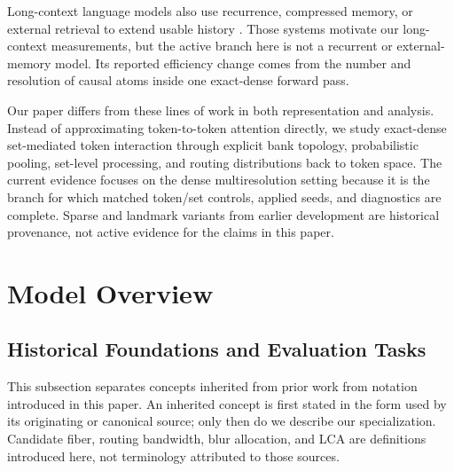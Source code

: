 \documentclass{article}
\theoremstyle{plain}
\theoremstyle{definition}
\theoremstyle{remark}
\begin{document}
Long-context language models also use recurrence, compressed memory, or
external retrieval to extend usable history
\citep{dai2019transformerxl,rae2019compressive,wu2022memorizing}.  Those systems
motivate our long-context measurements, but the active branch here is not a
recurrent or external-memory model.  Its reported efficiency change comes from
the number and resolution of causal atoms inside one exact-dense forward pass.

Our paper differs from these lines of work in both representation and analysis.
Instead of approximating token-to-token attention directly, we study exact-dense
set-mediated token interaction through explicit bank topology, probabilistic
pooling, set-level processing, and routing distributions back to token space.
The current evidence focuses on the dense multiresolution setting because it is
the branch for which matched token/set controls, applied seeds, and diagnostics
are complete.  Sparse and landmark variants from earlier development are
historical provenance, not active evidence for the claims in this paper.




\section{Model Overview}
\label{sec:model-overview}

\subsection{Historical Foundations and Evaluation Tasks}
\label{sec:background-primitives-tasks}

This subsection separates concepts inherited from prior work from notation
introduced in this paper.  An inherited concept is first stated in the form
used by its originating or canonical source; only then do we describe our
specialization.  Candidate fiber, routing bandwidth, blur allocation, and LCA
are definitions introduced here, not terminology attributed to those sources.
\end{document}
